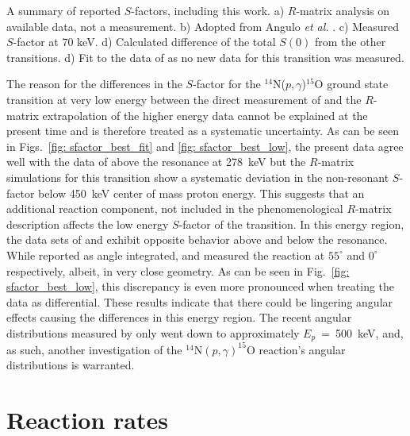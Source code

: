 \begin{table}
\begin{threeparttable}
\begin{tablenotes}
\small 
\item A summary of reported $S$-factors, including this work. a) $R$-matrix analysis on available data, not a measurement. b) Adopted from Angulo \textit{et al.} \cite{Angulo2001}. c) Measured $S$-factor at 70 keV. d) Calculated difference of the total $S(0)$ from the other transitions. d) Fit to the data of \cite{Schroder1987, Runkle2005, Imbriani2005} as no new data for this transition was measured.
\end{tablenotes}
\end{threeparttable}
\label{table: new_s_factors}
\end{table}


The reason for the differences in the $S$-factor for the $^{14}$N($p,\gamma$)$^{15}$O ground state transition at very low energy between the direct measurement of \citet{Imbriani2005} and the $R$-matrix extrapolation of the higher energy data cannot be explained at the present time and is therefore treated as a systematic uncertainty. As can be seen in Figs.~\ref{fig: sfactor_best_fit} and \ref{fig: sfactor_best_low}, the present data agree well with the data of \citet{Imbriani2005} above the resonance at 278~keV but the $R$-matrix simulations for this transition show a systematic deviation in the non-resonant $S$-factor below 450~keV center of mass proton energy. This suggests that an additional reaction component, not included in the phenomenological $R$-matrix description affects the low energy $S$-factor of the transition. In this energy region, the data sets of \citet{Imbriani2005} and \citet{Runkle2005} exhibit opposite behavior above and below the resonance. While reported as angle integrated, \citet{Imbriani2005} and \citet{Runkle2005} measured the reaction at $55^\circ$ and $0^\circ$ respectively, albeit, in very close geometry. As can be seen in Fig.~\ref{fig: sfactor_best_low}, this discrepancy is even more pronounced when treating the data as differential. These results indicate that there could be lingering angular effects causing the differences in this energy region. The recent angular distributions measured by \citet{Li2016} only went down to approximately $E_{p}$~=~500~keV, and, as such, another investigation of the $^{14}$N$(p,\gamma)^{15}$O reaction’s angular distributions is warranted. 




\section{Reaction rates}
\label{sec: reaction rates}



